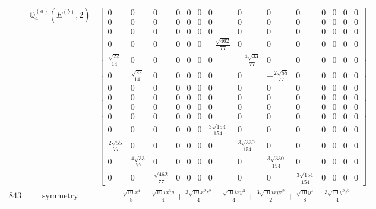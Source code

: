 \documentclass[fleqn,8pt,landscape]{jsarticle}
\begin{document}
\begin{longtable}{ccc}
$  $ & $ \mathbb{Q}_{4}^{(a)}(E^{(b)},2) $ & $ \begin{bmatrix} 0 & 0 & 0 & 0 & 0 & 0 & 0 & 0 & 0 & 0 & 0 & 0 & 0 & 0 \\ 0 & 0 & 0 & 0 & 0 & 0 & 0 & 0 & 0 & 0 & 0 & 0 & 0 & 0 \\ 0 & 0 & 0 & 0 & 0 & 0 & 0 & 0 & 0 & 0 & 0 & 0 & 0 & 0 \\ 0 & 0 & 0 & 0 & 0 & 0 & - \frac{\sqrt{462}}{77} & 0 & 0 & 0 & 0 & 0 & 0 & 0 \\ \frac{\sqrt{22}}{14} & 0 & 0 & 0 & 0 & 0 & 0 & - \frac{4 \sqrt{33}}{77} & 0 & 0 & 0 & 0 & 0 & 0 \\ 0 & \frac{\sqrt{22}}{14} & 0 & 0 & 0 & 0 & 0 & 0 & - \frac{2 \sqrt{55}}{77} & 0 & 0 & 0 & 0 & 0 \\ 0 & 0 & 0 & 0 & 0 & 0 & 0 & 0 & 0 & 0 & 0 & 0 & 0 & 0 \\ 0 & 0 & 0 & 0 & 0 & 0 & 0 & 0 & 0 & 0 & 0 & 0 & 0 & 0 \\ 0 & 0 & 0 & 0 & 0 & 0 & 0 & 0 & 0 & 0 & 0 & 0 & 0 & 0 \\ 0 & 0 & 0 & 0 & 0 & 0 & 0 & 0 & 0 & 0 & 0 & 0 & 0 & 0 \\ 0 & 0 & 0 & 0 & 0 & 0 & \frac{3 \sqrt{154}}{154} & 0 & 0 & 0 & 0 & 0 & 0 & 0 \\ \frac{2 \sqrt{55}}{77} & 0 & 0 & 0 & 0 & 0 & 0 & \frac{3 \sqrt{330}}{154} & 0 & 0 & 0 & 0 & 0 & 0 \\ 0 & \frac{4 \sqrt{33}}{77} & 0 & 0 & 0 & 0 & 0 & 0 & \frac{3 \sqrt{330}}{154} & 0 & 0 & 0 & 0 & 0 \\ 0 & 0 & \frac{\sqrt{462}}{77} & 0 & 0 & 0 & 0 & 0 & 0 & \frac{3 \sqrt{154}}{154} & 0 & 0 & 0 & 0 \end{bmatrix} $ \\ \hline
$ 843 $ & $ \text{symmetry} $ & $ - \frac{\sqrt{10} x^{4}}{8} - \frac{\sqrt{10} i x^{3} y}{4} + \frac{3 \sqrt{10} x^{2} z^{2}}{4} - \frac{\sqrt{10} i x y^{3}}{4} + \frac{3 \sqrt{10} i x y z^{2}}{2} + \frac{\sqrt{10} y^{4}}{8} - \frac{3 \sqrt{10} y^{2} z^{2}}{4} $ \\

\end{longtable}
\end{document}
